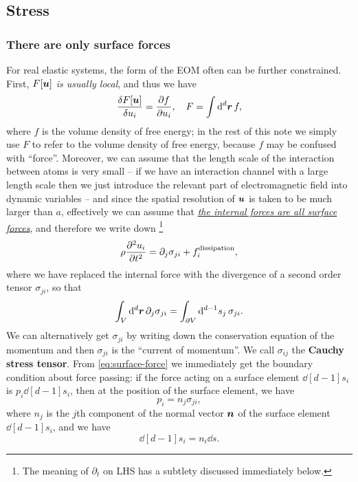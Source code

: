 \documentclass[hyperref, a4paper]{article}
\newcommand*{\concept}[1]{{\textbf{#1}}}
\begin{document}
\subsection{Stress}

\subsubsection{There are only surface forces}

For real elastic systems, 
the form of the EOM often can be further constrained.
First, \emph{$F[\vb*{u}]$ is usually local},
and thus we have 
\begin{equation}
    \fdv{F[\vb*{u}]}{u_i} = \pdv{f}{u_i}, \quad F = \int \dd[d]{\vb*{r}} f,
\end{equation}
where $f$ is the volume density of free energy;
in the rest of this note we simply use $F$ to refer to 
the volume density of free energy,
because $f$ may be confused with ``force''.
Moreover, we can assume that the length scale of the interaction 
between atoms 
is very small -- 
if we have an interaction channel with a large length scale 
then we just introduce the relevant part of electromagnetic field 
into dynamic variables -- 
and since the spatial resolution of $\vb*{u}$ is taken to be much larger than $a$,
effectively we can assume that 
\ul{\emph{the internal forces are all surface forces}},
and therefore we write down%
\footnote{
    The meaning of $\partial_t$ on LHS has a subtlety
    discussed immediately below.
}
\begin{equation}
    \rho \pdv[2]{u_i}{t} = \partial_{j} \sigma_{ji} + f_i^{\text{dissipation}},
    \label{eq:stress-eom-1}
\end{equation}
where we have replaced the internal force with 
the divergence of a second order tensor $\sigma_{ji}$,
so that
\begin{equation}
    \int_V \dd[d]{\vb*{r}} \partial_j \sigma_{ji}
    = \int_{\partial V} \dd[d-1]{s_j} \sigma_{ji}.
    \label{eq:surface-force}
\end{equation}
We can alternatively get $\sigma_{ji}$ by 
writing down the conservation equation of the momentum
and then $\sigma_{ji}$ is the ``current of momentum''.
We call $\sigma_{ij}$ the \concept{Cauchy stress tensor}.
From \eqref{eq:surface-force} we immediately get 
the boundary condition about force passing:
if the force acting on a surface element $\dd[d-1]{s_i}$ is 
$p_{i} \dd[d-1]{s_i}$,
then at the position of the surface element, we have 
\begin{equation}
    p_i = n_j \sigma_{ji},
    \label{eq:force-boundary-cond}
\end{equation}
where $n_j$ is the $j$th component of the normal vector $\vb*{n}$ of 
the surface element $\dd[d-1]{s_i}$,
and we have 
\begin{equation}
    \dd[d-1]{s_i} = n_i \dd{s}.
\end{equation}
\end{document}
